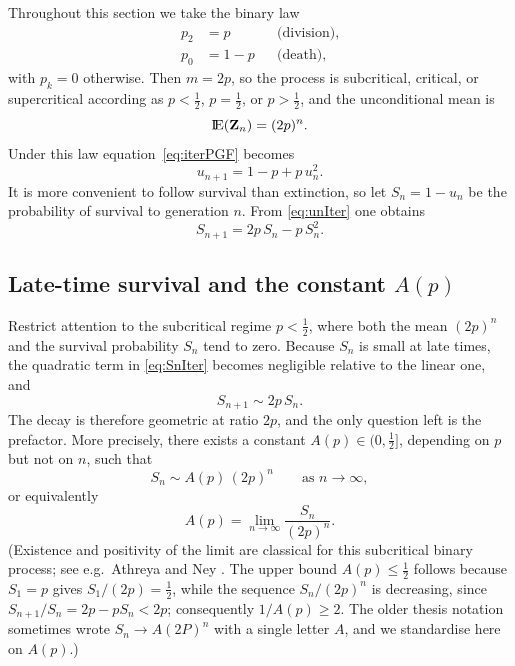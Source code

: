Throughout this section we take the binary law
\begin{align*}
p_2 &= p &&\text{(division)}, \\
p_0 &= 1-p &&\text{(death)},
\end{align*}
with $p_k=0$ otherwise. Then $m=2p$, so the process is subcritical, critical, or supercritical according as $p<\tfrac12$, $p=\tfrac12$, or $p>\tfrac12$, and the unconditional mean is
\[
{\rm I}\!{\rm E}({\bf Z}_n) = (2p)^n.
\]
Under this law equation~\eqref{eq:iterPGF} becomes
\begin{equation}
\label{eq:unIter}
u_{n+1} = 1-p + p\, u_n^2.
\end{equation}
It is more convenient to follow survival than extinction, so let $S_n=1-u_n$ be the probability of survival to generation $n$. From \eqref{eq:unIter} one obtains
\begin{equation}
\label{eq:SnIter}
S_{n+1} = 2p\, S_n - p\, S_n^2.
\end{equation}

\subsection{Late-time survival and the constant $A(p)$}
\label{sec:Ap-def}

Restrict attention to the subcritical regime $p<\tfrac12$, where both the mean $(2p)^n$ and the survival probability $S_n$ tend to zero. Because $S_n$ is small at late times, the quadratic term in \eqref{eq:SnIter} becomes negligible relative to the linear one, and
\[
S_{n+1} \sim 2p\, S_n.
\]
The decay is therefore geometric at ratio $2p$, and the only question left is the prefactor. More precisely, there exists a constant $A(p)\in\bigl(0,\tfrac12\bigr]$, depending on $p$ but not on $n$, such that
\begin{equation}
\label{eq:lateS}
S_n \sim A(p)\, (2p)^n
\qquad\text{as }n\to\infty,
\end{equation}
or equivalently
\begin{equation}
\label{eq:Ap-limit}
A(p)
=
\lim_{n\to\infty}
\frac{S_n}{(2p)^n}.
\end{equation}
(Existence and positivity of the limit are classical for this subcritical binary process; see e.g.\ Athreya and Ney \cite{Athreya1972}. The upper bound $A(p)\leq\tfrac12$ follows because $S_1=p$ gives $S_1/(2p)=\tfrac12$, while the sequence $S_n/(2p)^n$ is decreasing, since $S_{n+1}/S_n=2p-p S_n<2p$; consequently $1/A(p)\geq 2$. The older thesis notation sometimes wrote $S_n\to A(2P)^n$ with a single letter $A$, and we standardise here on $A(p)$.)

